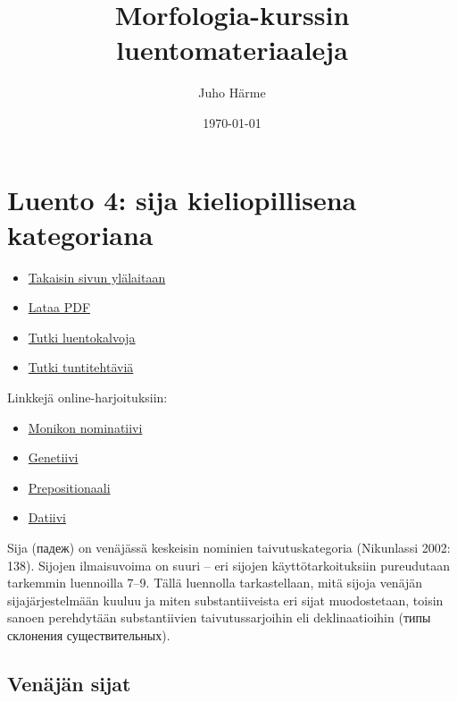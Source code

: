 \documentclass[]{scrartcl}
\author{Juho Härme}
\title{Morfologia-kurssin luentomateriaaleja}
\date{\today}
\providecommand{\tightlist}{%
  \setlength{\itemsep}{0pt}\setlength{\parskip}{0pt}}
\begin{document}
\maketitle
\tableofcontents
\newpage



\section{Luento 4: sija kieliopillisena
kategoriana}\label{luento-4-sija-kieliopillisena-kategoriana}

\begin{itemize}
\tightlist
\item
  \href{https://mustikka.uta.fi/~juho_harme/morfologia/\#tästä-kurssista}{Takaisin
  sivun ylälaitaan}
\item
  \href{http://mustikka.uta.fi/~juho_harme/morfologia/materiaalit/luento4.pdf}{Lataa
  PDF}
\item
  \href{http://mustikka.uta.fi/~juho_harme/morfologia/presentations/luento4.html}{Tutki
  luentokalvoja}
\item
  \href{http://mustikka.uta.fi/~juho_harme/morfologia/tehtavat/luento4.pdf}{Tutki
  tuntitehtäviä}
\end{itemize}

Linkkejä online-harjoituksiin:

\begin{itemize}
\tightlist
\item
  \href{http://www.auburn.edu/~mitrege/russian/exercises/0018g.html}{Monikon
  nominatiivi}
\item
  \href{http://www.auburn.edu/~mitrege/russian/exercises/0095.html}{Genetiivi}
\item
  \href{http://www.auburn.edu/~mitrege/russian/exercises/0033.html}{Prepositionaali}
\item
  \href{http://www.auburn.edu/~mitrege/russian/exercises/0049.html}{Datiivi}
\end{itemize}

Sija (падеж) on venäjässä keskeisin nominien taivutuskategoria
(Nikunlassi 2002: 138). Sijojen ilmaisuvoima on suuri -- eri sijojen
käyttötarkoituksiin pureudutaan tarkemmin luennoilla 7--9. Tällä
luennolla tarkastellaan, mitä sijoja venäjän sijajärjestelmään kuuluu ja
miten substantiiveista eri sijat muodostetaan, toisin sanoen perehdytään
substantiivien taivutussarjoihin eli deklinaatioihin (типы склонения
существительных).

\subsection{Venäjän sijat}\label{venuxe4juxe4n-sijat}
\end{document}
